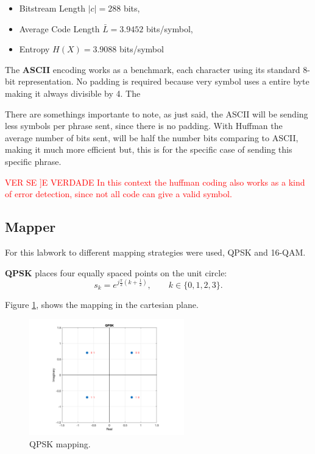 \begin{itemize}
  \item Bitstream Length $\lvert c\rvert = 288$ bits,
  \item Average Code Length $\bar L = 3.9452$ bits/symbol,
  \item Entropy $H(X)=3.9088$ bits/symbol
\end{itemize}



The \textbf{ASCII} encoding works as a benchmark, each character using its standard 8-bit representation. No padding is required because very symbol uses a entire byte making it always divisible by 4. The 

There are somethings importante to note, as just said, the ASCII will be sending less symbols per phrase sent, since there is no padding. With Huffman the average number of bits sent, will be half the number bits comparing to ASCII, making it much more efficient but, this is for the specific case of sending this specific phrase. 

\textcolor{red}{VER SE ]E VERDADE  In this context the huffman coding also works as a kind of error detection, since not all code can give a valid symbol.}

\subsection{Mapper}

For this labwork to different mapping strategies were used, QPSK and 16-QAM.

\textbf{QPSK} places four equally spaced points on the unit circle:
\[
s_k = e^{j\frac{\pi}{2}\left(k+\tfrac12\right)}, \qquad k\in\{0,1,2,3\}.
\]

Figure \ref{fig:QPKS_Mapping}, shows the mapping in the cartesian plane.

\begin{figure}[h]
  \centering
  \includegraphics[width=0.6\textwidth]{Images/QPKS_Mapping.png}
  \caption{QPSK mapping.}
  \label{fig:QPKS_Mapping}
\end{figure}

